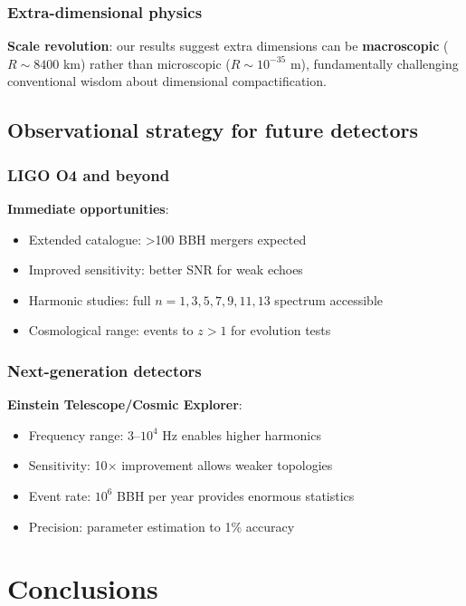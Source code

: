 \documentclass[12pt]{article}
\begin{document}
\subsubsection{Extra-dimensional physics}

\textbf{Scale revolution}: our results suggest extra dimensions can be \textbf{macroscopic} ($R \sim 8400$ km) rather than microscopic ($R \sim 10^{-35}$ m), fundamentally challenging conventional wisdom about dimensional compactification.

\subsection{Observational strategy for future detectors}

\subsubsection{LIGO O4 and beyond}

\textbf{Immediate opportunities}:
\begin{itemize}
\item Extended catalogue: >100 BBH mergers expected
\item Improved sensitivity: better SNR for weak echoes
\item Harmonic studies: full $n=1,3,5,7,9,11,13$ spectrum accessible
\item Cosmological range: events to $z>1$ for evolution tests
\end{itemize}

\subsubsection{Next-generation detectors}

\textbf{Einstein Telescope/Cosmic Explorer}:
\begin{itemize}
\item Frequency range: 3--$10^4$ Hz enables higher harmonics
\item Sensitivity: 10$\times$ improvement allows weaker topologies
\item Event rate: $10^6$ BBH per year provides enormous statistics
\item Precision: parameter estimation to 1\% accuracy
\end{itemize}

\section{Conclusions}
\end{document}

